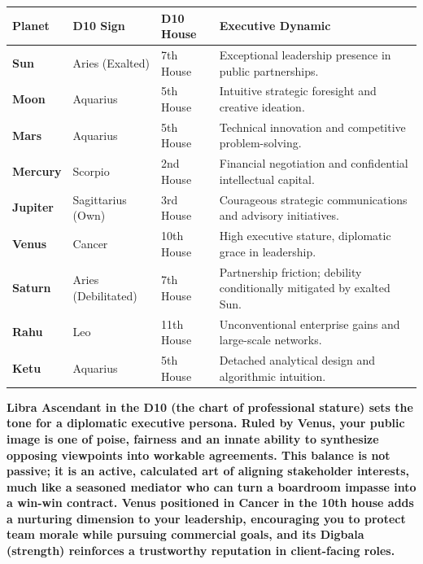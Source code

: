 \begin{executivecard}
  \sffamily\fontsize{8}{11.5}\selectfont
  \begin{tabularx}{\linewidth}{@{}l l l X@{}}
    \toprule
    \textbf{Planet} & \textbf{D10 Sign} & \textbf{D10 House} & \textbf{Executive Dynamic} \\
    \midrule
    \textbf{Sun} & Aries (Exalted) & 7th House & Exceptional leadership presence in public partnerships. \\
    \textbf{Moon} & Aquarius & 5th House & Intuitive strategic foresight and creative ideation. \\
    \textbf{Mars} & Aquarius & 5th House & Technical innovation and competitive problem-solving. \\
    \textbf{Mercury} & Scorpio & 2nd House & Financial negotiation and confidential intellectual capital. \\
    \textbf{Jupiter} & Sagittarius (Own) & 3rd House & Courageous strategic communications and advisory initiatives. \\
    \textbf{Venus} & Cancer & 10th House & High executive stature, diplomatic grace in leadership. \\
    \textbf{Saturn} & Aries (Debilitated) & 7th House & Partnership friction; debility conditionally mitigated by exalted Sun. \\
    \textbf{Rahu} & Leo & 11th House & Unconventional enterprise gains and large-scale networks. \\
    \textbf{Ketu} & Aquarius & 5th House & Detached analytical design and algorithmic intuition. \\
    \bottomrule
  \end{tabularx}
\end{executivecard}\vspace{2mm}

\label{topic26}

{\fontsize{9.5}{13.8}\selectfont\bfseries\color{DeepSlate} Libra Ascendant in the D10 (the chart of professional stature) sets the tone for a diplomatic executive persona. Ruled by Venus, your public image is one of poise, fairness and an innate ability to synthesize opposing viewpoints into workable agreements. This balance is not passive; it is an active, calculated art of aligning stakeholder interests, much like a seasoned mediator who can turn a boardroom impasse into a win-win contract. Venus positioned in Cancer in the 10th house adds a nurturing dimension to your leadership, encouraging you to protect team morale while pursuing commercial goals, and its Digbala (strength) reinforces a trustworthy reputation in client-facing roles.}\par\vspace{2mm}

